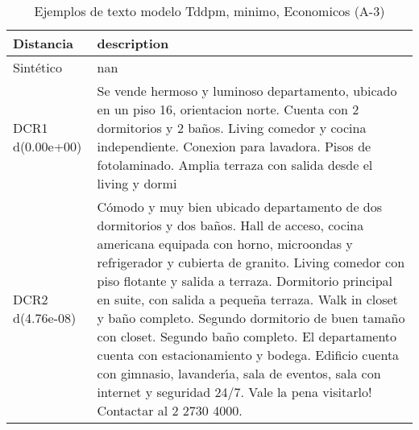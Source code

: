 \begin{table}[H]
\centering
\fontsize{10}{14}\selectfont
\caption{Ejemplos de texto modelo Tddpm, minimo, Economicos (A-3)}
\label{table-example-economicos-a-3-tddpm_mlp-min-text}
\begin{tabular}{|l|m{35em}|}
\hline
\rowcolor[gray]{0.8}
Distancia & description \\
\hline Sintético & nan \\
\hline DCR1 d(0.00e+00) & Se vende hermoso y luminoso departamento, ubicado en un piso 16, orientacion norte. Cuenta con 2 dormitorios y 2 ba\~nos. Living comedor y cocina independiente. Conexion para lavadora. Pisos de fotolaminado. Amplia terraza con salida desde el living y dormi \\
\hline DCR2 d(4.76e-08) & C\'omodo y muy bien ubicado departamento de dos dormitorios y dos ba\~nos. Hall de acceso, cocina americana equipada con horno, microondas y refrigerador y cubierta de granito. Living comedor con piso flotante y salida a terraza. Dormitorio principal en suite, con salida a peque\~na terraza. Walk in closet y ba\~no completo. Segundo dormitorio de buen tama\~no con closet. Segundo ba\~no completo. El departamento cuenta con estacionamiento y bodega.  Edificio cuenta con gimnasio, lavander{\'\i}a, sala de eventos, sala con internet y seguridad 24/7.  Vale la pena visitarlo! Contactar al 2 2730 4000. \\
\hline
\end{tabular}
\end{table}
